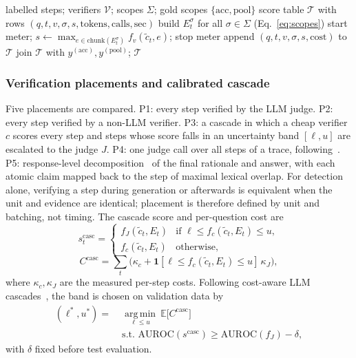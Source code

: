 \documentclass[conference]{IEEEtran}
\newcommand{\ctil}{\tilde{c}}
\begin{document}
\begin{algorithm}[t]
\caption{Scope-controlled scoring with cost metering}\label{alg:scope}
\begin{algorithmic}[1]
\Require labelled steps; verifiers $\mathcal{V}$; scopes $\Sigma$; gold scopes $\{\mathrm{acc},\mathrm{pool}\}$
\Ensure score table $\mathcal{T}$ with rows $(q,t,v,\sigma,s,\text{tokens},\text{calls},\text{sec})$
  \State build $E_t^{\sigma}$ for all $\sigma\in\Sigma$ (Eq.~\ref{eq:scopes})
    \State start meter; $s \gets \max_{e\in\mathrm{chunk}(E_t^\sigma)} f_v(\ctil_t,e)$; stop meter
    \State append $(q,t,v,\sigma,s,\text{cost})$ to $\mathcal{T}$
  \EndFor
\EndFor
\State join $\mathcal{T}$ with $y^{(\mathrm{acc})}, y^{(\mathrm{pool})}$; \Return $\mathcal{T}$
\end{algorithmic}
\end{algorithm}

\subsubsection{Verification placements and calibrated cascade}
Five placements are compared. P1: every step verified by the LLM judge. P2: every step verified by a non-LLM verifier. P3: a cascade in which a cheap verifier $c$ scores every step and steps whose score falls in an uncertainty band $[\ell,u]$ are escalated to the judge $J$. P4: one judge call over all steps of a trace, following~\cite{pham2026grace}. P5: response-level decomposition~\cite{min2023factscore} of the final rationale and answer, with each atomic claim mapped back to the step of maximal lexical overlap. For detection alone, verifying a step during generation or afterwards is equivalent when the unit and evidence are identical; placement is therefore defined by unit and batching, not timing. The cascade score and per-question cost are
\begin{equation}
s^{\mathrm{casc}}_t=\begin{cases}f_J(\ctil_t,E_t) & \text{if } \ell\le f_c(\ctil_t,E_t)\le u,\\ f_c(\ctil_t,E_t) & \text{otherwise,}\end{cases}
\end{equation}
\begin{equation}
C^{\mathrm{casc}}=\textstyle\sum_t\big(\kappa_c+\mathbf{1}[\ell\le f_c(\ctil_t,E_t)\le u]\,\kappa_J\big),
\end{equation}
where $\kappa_c,\kappa_J$ are the measured per-step costs. Following cost-aware LLM cascades~\cite{chen2023frugalgpt}, the band is chosen on validation data by
\begin{equation}\label{eq:band}
\begin{split}
(\ell^{*},u^{*})=\;&\operatorname*{arg\,min}_{\ell\le u}\ \mathbb{E}\big[C^{\mathrm{casc}}\big]\\
&\text{s.t. } \mathrm{AUROC}(s^{\mathrm{casc}})\ge\mathrm{AUROC}(f_J)-\delta,
\end{split}
\end{equation}
with $\delta$ fixed before test evaluation.
\end{document}
